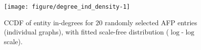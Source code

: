 \begin{knitrout}
\color{fgcolor}\begin{figure}[!htbp]

{\centering \texttt{[image: figure/degree\_ind\_density-1]} 

}

\caption[CCDF of entity in-degrees for $20$ randomly selected AFP entries (individual graphs), with fitted scale-free distribution ($\log$-$\log$ scale)]{CCDF of entity in-degrees for $20$ randomly selected AFP entries (individual graphs), with fitted scale-free distribution ($\log$-$\log$ scale).}\label{fig:degree_ind_density}
\end{figure}

\end{knitrout}
